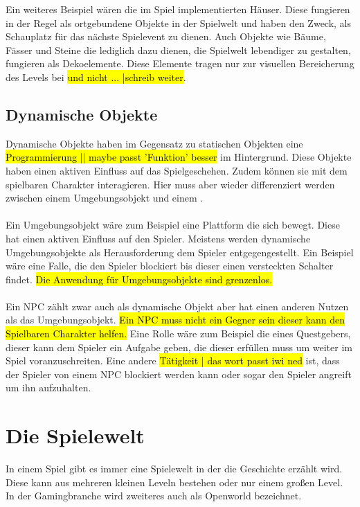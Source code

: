 Ein weiteres Beispiel wären die im Spiel implementierten Häuser. Diese fungieren in der Regel als ortgebundene Objekte in der Spielwelt und haben den Zweck, als Schauplatz für das nächste Spielevent zu dienen. Auch Objekte wie Bäume, Fässer und Steine die lediglich dazu dienen, die Spielwelt lebendiger zu gestalten, fungieren als Dekoelemente. Diese Elemente tragen nur zur visuellen Bereicherung des Levels bei \hl{und nicht ... |schreib weiter}.


\subsection{Dynamische Objekte}
Dynamische Objekte haben im Gegensatz zu statischen Objekten eine \hl{Programmierung || maybe passt 'Funktion' besser} im Hintergrund. Diese Objekte haben einen aktiven Einfluss auf das Spielgeschehen. Zudem können sie mit dem spielbaren Charakter interagieren. Hier muss aber wieder differenziert werden zwischen einem Umgebungsobjekt und einem .\\\\
Ein Umgebungsobjekt wäre zum Beispiel eine Plattform die sich bewegt. Diese hat einen aktiven Einfluss auf den Spieler. Meistens werden dynamische Umgebungsobjekte als Herausforderung dem Spieler entgegengestellt. Ein Beispiel wäre eine Falle, die den Spieler blockiert bis dieser einen versteckten Schalter findet. \hl{
    Die Anwendung für Umgebungsobjekte sind grenzenlos. %
}\\\\
Ein NPC zählt zwar auch als dynamische Objekt aber hat einen anderen Nutzen als das Umgebungsobjekt. \hl{Ein NPC muss nicht ein Gegner sein dieser kann den Spielbaren Charakter helfen.} Eine Rolle wäre zum Beispiel die eines Questgebers, dieser kann dem Spieler ein Aufgabe geben, die dieser erfüllen muss um weiter im Spiel voranzuschreiten. Eine andere \hl{Tätigkeit | das wort passt iwi ned} ist, dass der Spieler von einem NPC blockiert werden kann oder sogar den Spieler angreift um ihn aufzuhalten.

\pagebreak

\section{Die Spielewelt}
In einem Spiel gibt es immer eine Spielewelt in der die Geschichte erzählt wird. Diese kann aus mehreren kleinen Leveln bestehen oder nur einem großen Level. In der Gamingbranche wird zweiteres auch als Openworld bezeichnet.


